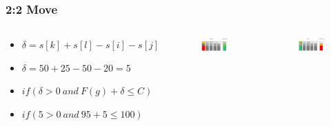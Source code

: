 \documentclass{beamer}
\begin{document}
\begin{frame}
\frametitle{2:2 Move}
\begin{columns}[c] %
\begin{footnotesize}
\begin{itemize}
\item $\delta = s[k]+s[l]-s[i]-s[j]$
\item $\delta = 50 + 25 - 50 - 20 = 5$
\item $if(\delta > 0 \ and \ F(g)+\delta \leq C)$
\item $if(5 > 0 \ and \ 95+5 \leq 100)$
\end{itemize}
\end{footnotesize}
\begin{figure}[!htbp]
\begin{center}
\includegraphics[scale=0.22]{img/Zwei_zwei_Move_1.png}
\end{center}
\label{fig:architecture}
\end{figure}
\begin{figure}[!htbp]
\begin{center}
\includegraphics[scale=0.22]{img/Zwei_zwei_Move_2.png}
\end{center}
\label{fig:architecture}
\end{figure}
\end{columns}



\end{frame}
\end{document}

